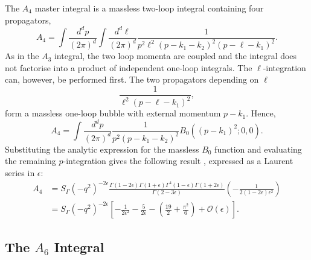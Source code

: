 The $A_4$ master integral is a massless two-loop integral containing four propagators,
\begin{equation}
    A_4 = \int \frac{d^dp}{(2\pi)^d}\int\frac{d^d\ell}{(2\pi)^d}\frac1{p^2\ell^2(p-k_1-k_2)^2(p-\ell-k_1)^2}.
\end{equation}
As in the $A_3$ integral, the two loop momenta are coupled and the integral does not factorise into a
product of independent one-loop integrals. The $\ell$-integration can, however, be performed first.
The two propagators depending on $\ell$
\begin{equation}
    \frac1{\ell^2(p-\ell-k_1)^2},
\end{equation}
form a massless one-loop bubble with external momentum $p-k_1$. Hence,
\begin{equation}
    A_4 = \int\frac{d^dp}{(2\pi)^d}\frac1{p^2(p-k_1-k_2)^2}B_0\!\left((p-k_1)^2;0,0\right).
\end{equation}
Substituting the analytic expression for the massless $B_0$ function and evaluating the remaining
$p$-integration gives the following result \cite{Gehrmann-DeRidder:2005btv}, expressed as a Laurent
series in $\epsilon$:
\begin{equation}
    \begin{split}
        A_4 &= S_\Gamma\!\left(-q^2\right)^{-2\epsilon}\frac{\Gamma(1-2\epsilon)\Gamma(1+\epsilon)\Gamma^4(1-\epsilon)\Gamma(1+2\epsilon)}{\Gamma(2-3\epsilon)}\!\left(-\frac1{2(1-2\epsilon)\epsilon^2}\right)\\
            &= S_\Gamma\!\left(-q^2\right)^{-2\epsilon}\!\left[-\frac1{2\epsilon^2}-\frac5{2\epsilon}-\left(\frac{19}2+\frac{\pi^2}6\right)+\mathcal O(\epsilon)\right].
    \end{split}
\end{equation}

\subsection{The $A_6$ Integral}\label{subsubsec:A6}

